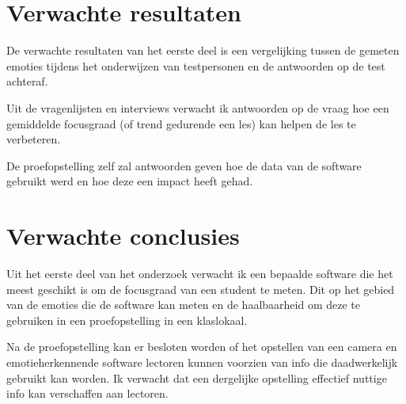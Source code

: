 \section{Verwachte resultaten}
\label{sec:verwachte_resultaten}



De verwachte resultaten van het eerste deel is een vergelijking tussen de gemeten emoties tijdens het onderwijzen van testpersonen en de antwoorden op de test achteraf. 

Uit de vragenlijsten en interviews verwacht ik antwoorden op de vraag hoe een gemiddelde focusgraad (of trend gedurende een les) kan helpen de les te verbeteren.

De proefopstelling zelf zal antwoorden geven hoe de data van de software gebruikt werd en hoe deze een impact heeft gehad. 


\section{Verwachte conclusies}
\label{sec:verwachte_conclusies}


Uit het eerste deel van het onderzoek verwacht ik een bepaalde software die het meest geschikt is om de focusgraad van een student te meten. Dit op het gebied van de emoties die de software kan meten en de haalbaarheid om deze te gebruiken in een proefopstelling in een klaslokaal.

Na de proefopstelling kan er besloten worden of het opstellen van een camera en emotieherkennende software lectoren kunnen voorzien van info die daadwerkelijk gebruikt kan worden. Ik verwacht dat een dergelijke opstelling effectief nuttige info kan verschaffen aan lectoren.